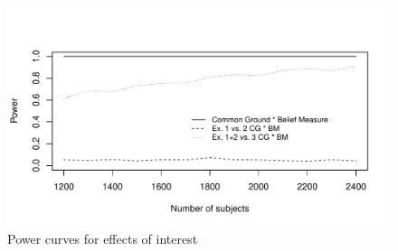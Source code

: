\documentclass{sp}\usepackage[]{graphicx}\usepackage[]{color}
\makeatletter
\def\maxwidth{ %
  \ifdim\Gin@nat@width>\linewidth
    \linewidth
  \else
    \Gin@nat@width
  \fi
}
\newenvironment{knitrout}{}{} %
\makeatother
\begin{document}
\begin{figure}\begin{center}
\begin{knitrout}
\color{fgcolor}
\includegraphics[width=\maxwidth]{figure/powerfig-1} 

\end{knitrout}
\end{center}
\caption{Power curves for effects of interest}
\label{fig:power}
\end{figure}
\end{document}
